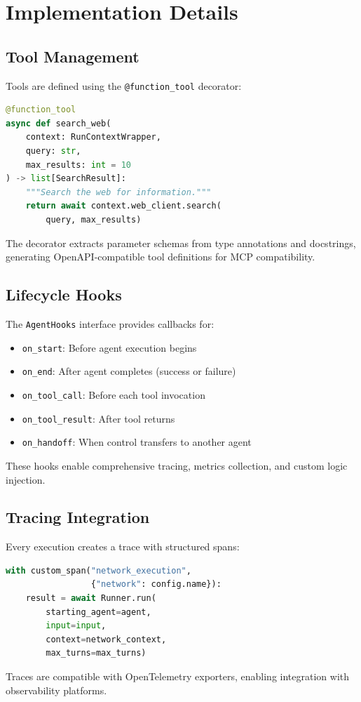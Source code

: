 \section{Implementation Details}


\subsection{Tool Management}

Tools are defined using the \texttt{@function\_tool} decorator:

\begin{lstlisting}[language=Python]
@function_tool
async def search_web(
    context: RunContextWrapper,
    query: str,
    max_results: int = 10
) -> list[SearchResult]:
    """Search the web for information."""
    return await context.web_client.search(
        query, max_results)
\end{lstlisting}

The decorator extracts parameter schemas from type annotations and docstrings, generating OpenAPI-compatible tool definitions for MCP compatibility.

\subsection{Lifecycle Hooks}

The \texttt{AgentHooks} interface provides callbacks for:
\begin{itemize}
    \item \texttt{on\_start}: Before agent execution begins
    \item \texttt{on\_end}: After agent completes (success or failure)
    \item \texttt{on\_tool\_call}: Before each tool invocation
    \item \texttt{on\_tool\_result}: After tool returns
    \item \texttt{on\_handoff}: When control transfers to another agent
\end{itemize}

These hooks enable comprehensive tracing, metrics collection, and custom logic injection.

\subsection{Tracing Integration}

Every execution creates a trace with structured spans:

\begin{lstlisting}[language=Python]
with custom_span("network_execution",
                 {"network": config.name}):
    result = await Runner.run(
        starting_agent=agent,
        input=input,
        context=network_context,
        max_turns=max_turns)
\end{lstlisting}

Traces are compatible with OpenTelemetry exporters, enabling integration with observability platforms.

